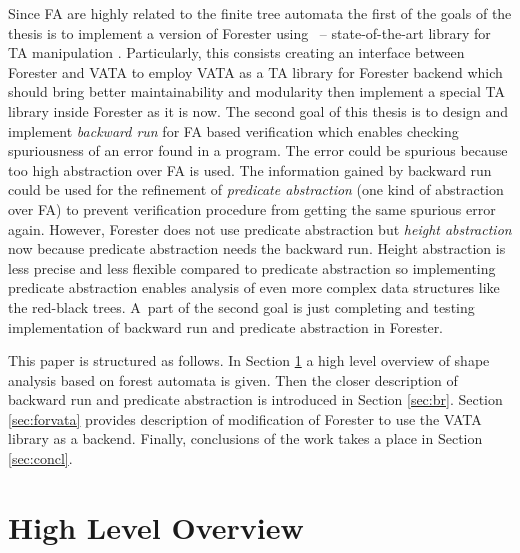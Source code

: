 \documentclass[fleqn,11pt]{ExcelAtFIT} %
\begin{document}
Since FA are highly related to the finite tree automata the first of the goals of the thesis is to implement
a version of Forester using \vata\ -- state-of-the-art library for TA manipulation \cite{libvata}.
Particularly, this consists creating an interface between Forester and VATA to employ VATA as a TA library for Forester backend
which should bring better maintainability and modularity then implement a special TA library inside Forester as it is now.
The second goal of this thesis is to design and implement \emph{backward run} for FA based verification
which enables checking spuriousness of an error found in a program.
The error could be spurious because too high abstraction over FA is used.
The information gained by backward run could be used for the refinement of \emph{predicate abstraction} (one kind of abstraction over FA)
to prevent verification procedure from getting the same spurious error again.
However, Forester does not use predicate abstraction but \emph{height abstraction} now
because predicate abstraction needs the backward run.
Height abstraction is less precise and less flexible compared to predicate abstraction so implementing predicate abstraction
enables analysis of even more complex data structures like the red-black trees.
A~part of the second goal is just completing and testing implementation of backward run and predicate abstraction in Forester.

This paper is structured as follows.
In Section \ref{sec:overview} a high level overview of shape analysis based on forest automata
is given.
Then the closer description of backward run and predicate abstraction is introduced in Section \ref{sec:br}.
Section \ref{sec:forvata} provides description of modification of Forester to use the VATA library as a backend.
Finally, conclusions of the work takes a place in Section \ref{sec:concl}.

\section{High Level Overview}
\label{sec:overview}
\end{document}
